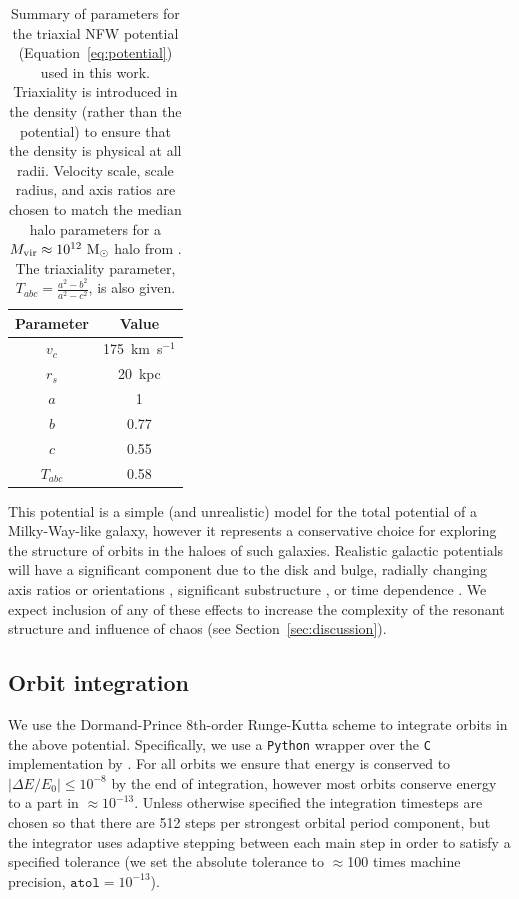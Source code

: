 \documentclass[letterpaper,12pt,preprint]{aastex}
\newcommand{\msun}{\ensuremath{\mathrm{M}_\odot}}
\begin{document}
\begin{table}[ht]
\begin{center}
	\begin{tabular}{ c  c }
	         Parameter & Value\\\toprule
		$v_c$ & 175~km~s$^{-1}$\\
		$r_s$ & 20~kpc\\
		$a$ & 1\\
		$b$ & 0.77\\
		$c$ & 0.55\\
		\midrule
		$T_{abc}$ & 0.58\\
		\bottomrule
		\end{tabular}
	\caption{Summary of parameters for the triaxial NFW potential (Equation~\ref{eq:potential}) used in this work. Triaxiality is introduced in the density (rather than the potential) to ensure that the density is physical at all radii. Velocity scale, scale radius, and axis ratios are chosen to match the median halo parameters for a $M_{\rm vir} \approx 10^{12}~\msun$ halo from \citep{jing02}. The triaxiality parameter, $T_{abc} = \frac{a^2 - b^2}{a^2 - c^2}$, is also given. \label{tbl:potential}}
\end{center}
\end{table}

This potential is a simple (and unrealistic) model for the total potential of a Milky-Way-like galaxy, however it represents a conservative choice for exploring the structure of orbits in the haloes of such galaxies. Realistic galactic potentials will have a significant component due to the disk and bulge, radially changing axis ratios or orientations \citep[e.g.,][]{romanowsky98, kazantzidis04,debattista08,veraciro11,butsky15}, significant substructure \citep{moore98,zemp09}, or time dependence \citep[either from bulk rotation, mass growth, mergers, etc.; see, e.g.,][]{bailin05}. We expect inclusion of any of these effects to increase the complexity of the resonant structure and influence of chaos (see Section~\ref{sec:discussion}).

\subsection{Orbit integration}\label{sec:integration}

We use the Dormand-Prince 8th-order Runge-Kutta scheme \citep{prince81} to integrate orbits in the above potential. Specifically, we use a \texttt{Python} wrapper over the \texttt{C} implementation by \cite{hairer93}. For all orbits we ensure that energy is conserved to $|\Delta E/E_0| \leq 10^{-8}$ by the end of integration, however most orbits conserve energy to a part in $\approx$$10^{-13}$. Unless otherwise specified the integration timesteps are chosen so that there are 512 steps per strongest orbital period component, but the integrator uses adaptive stepping between each main step in order to satisfy a specified tolerance (we set the absolute tolerance to $\approx$100 times machine precision, $\texttt{atol} = 10^{-13}$).
\end{document}
